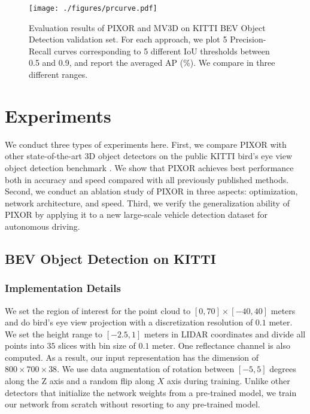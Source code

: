 

\begin{figure*}[t]
\begin{center}
   \texttt{[image: ./figures/prcurve.pdf]}
\end{center}
\vspace*{-2mm}
\caption{Evaluation results of PIXOR and MV3D \cite{mv3d} on KITTI BEV Object Detection validation set. For each approach, we plot 5 Precision-Recall curves corresponding to 5 different IoU thresholds between 0.5 and 0.9, and report the averaged AP (\%). We compare in three different ranges.}
\label{fig:fine_kitti}
\vspace{-0.3cm}
\end{figure*}


\section{Experiments}

We conduct three types of experiments here. First, we compare PIXOR with other state-of-the-art 3D object detectors on the public KITTI bird's eye view object detection benchmark \cite{kitti}. We show that PIXOR achieves best performance both in accuracy and speed compared with all previously published methods. Second, we conduct an ablation study of PIXOR in three aspects: optimization, network architecture, and speed. Third, we verify the generalization ability of PIXOR by applying it to a new large-scale vehicle detection dataset for autonomous driving.

\subsection{BEV Object Detection on KITTI}

\subsubsection{Implementation Details} 
We set the region of interest for the point cloud to $[0, 70] \times [-40, 40]$ meters and do bird's eye view projection with a discretization resolution of $0.1$ meter. We set the height range to $[-2.5, 1]$ meters in LIDAR coordinates and divide all points into $35$ slices with bin size of $0.1$ meter. One reflectance channel is also computed. As a result, our input representation has the dimension of $800 \times 700 \times 38$. We use data augmentation of rotation between $[-5, 5]$ degrees along the Z axis and a random flip along $X$ axis during training. Unlike other detectors \cite{mv3d} that initialize the network weights from a pre-trained model, we train our network from scratch without resorting to any pre-trained model.

